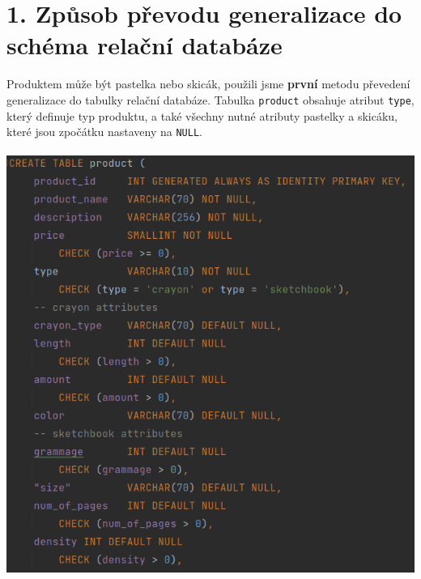 \documentclass[12pt]{article}
\begin{document}
\section*{1. Způsob převodu generalizace do schéma relační databáze}
    Produktem může být pastelka nebo skicák, použili jsme \textbf{první} metodu převedení generalizace do tabulky relační databáze. Tabulka \texttt{product} obsahuje atribut \texttt{type}, který definuje typ produktu, a také všechny nutné atributy pastelky a skicáku, které jsou zpočátku nastaveny na \texttt{NULL}.
    \\
    \\
    \includegraphics[scale=0.45]{10.png}

\newpage
\end{document}
